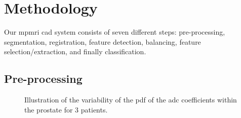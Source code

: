 \section{Methodology}\label{sec:chp6:method}

Our \ac{mpmri} \ac{cad} system consists of seven different steps: pre-processing, segmentation, registration, feature detection, balancing, feature selection/extraction, and finally classification.

\subsection{Pre-processing}\label{subsec:chp6:method:PP}

\begin{figure}
  \hspace*{\fill}
  \hfill
  \hfill
  \hspace*{\fill}
  \caption[Illustration of the \acs*{pdf} of the \acs*{adc} coefficients within the prostate.]{Illustration of the variability of the \acs*{pdf} of the \acs*{adc} coefficients within the prostate for 3 patients.}
  \label{fig:adcpdf}
\end{figure}


